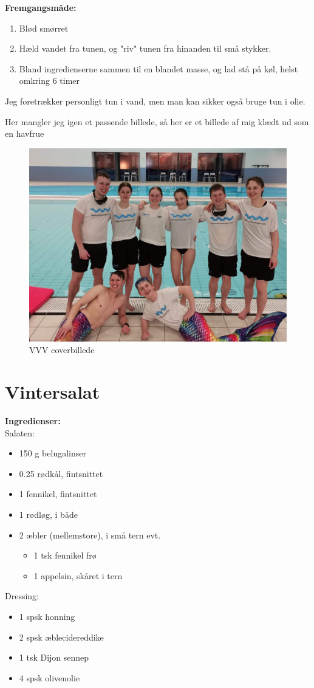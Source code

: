\documentclass{book}
\begin{document}
\begin{minipage}[t]{0.5\textwidth}
\textbf{Fremgangsmåde:}
\begin{enumerate}
    \item Blød smørret
    \item Hæld vandet fra tunen, og "riv" tunen fra hinanden til små stykker.
    \item Bland ingredienserne sammen til en blandet masse, og lad stå på køl, helst omkring 6 timer
\end{enumerate}
\end{minipage}
Jeg foretrækker personligt tun i vand, men man kan sikker også bruge tun i olie.

\newpage Her mangler jeg igen et passende billede, så her er et billede af mig klædt ud som en havfrue\begin{figure}
    \centering
    \includegraphics[width=0.75\linewidth]{received_483340176906259.jpeg}
    \caption{VVV coverbillede}
    
\end{figure}
\newpage \section{Vintersalat}
\begin{minipage}[t]{0.5\textwidth}
\textbf{Ingredienser:}
\\ Salaten: 
\begin{itemize}
    \item 150 g belugalinser
    \item 0.25 rødkål, fintsnittet
    \item 1 fennikel, fintsnittet
    \item 1 rødløg, i både
    \item 2 æbler (mellemstore), i små tern
    evt.
    \begin{itemize}
        \item 1 tsk fennikel frø
        \item 1 appelsin, skåret i tern
    \end{itemize}
\end{itemize}
Dressing:
\begin{itemize}
    \item 1 spsk honning
    \item 2 spsk æblecidereddike
    \item 1 tsk Dijon sennep
    \item 4 spsk olivenolie
\end{itemize}
\end{minipage}
\end{document}
